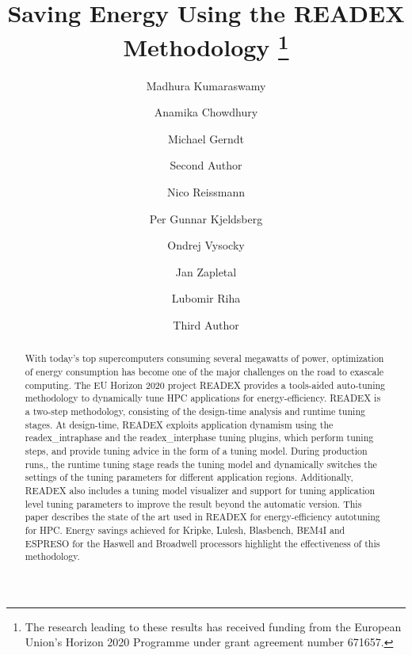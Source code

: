 \documentclass[runningheads]{llncs}
\begin{document}
%
\title{Saving Energy Using the READEX Methodology \thanks{The research leading to these results has received funding from the European Union's Horizon 2020 Programme under grant agreement number 671657.}}
%
%
\author{Madhura Kumaraswamy \and Anamika Chowdhury \and Michael Gerndt  \and
Second Author \and
Nico Reissmann  \and Per Gunnar Kjeldsberg  \and
Ondrej Vysocky  \and Jan Zapletal  \and Lubomir Riha 
\and Third Author}
%
%

\maketitle              %

\begin{abstract}
With today's top supercomputers consuming several megawatts of power, optimization of energy consumption has become one of the major challenges on the road to exascale computing.
The EU Horizon 2020 project READEX provides a tools-aided auto-tuning methodology to dynamically tune HPC applications for energy-efficiency. READEX is a two-step methodology, consisting of the design-time analysis and runtime tuning stages. At design-time, READEX exploits application dynamism using the readex\_intraphase and the readex\_interphase tuning plugins, which perform tuning steps, and provide tuning advice in the form of a tuning model. During production runs,, the runtime tuning stage reads the tuning model and  dynamically switches the settings of the tuning parameters for different application regions. Additionally, READEX also includes a tuning model visualizer and support for tuning application level tuning parameters to improve the result beyond the automatic version. This paper describes the state of the art used in READEX for energy-efficiency autotuning for HPC. Energy savings achieved for Kripke, Lulesh, Blasbench, BEM4I and ESPRESO for the Haswell and Broadwell processors highlight the effectiveness of this methodology.

\end{abstract}
\end{document}
